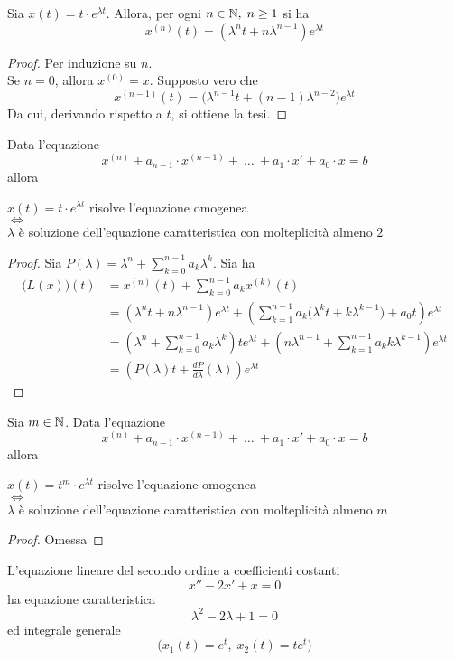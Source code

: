 \begin{lemma}
	Sia $x(t)=t \cdot e^{\lambda t}$. Allora, per ogni $n\in\mathbb{N},\;n \geq 1$ si ha
	\[x^{(n)}(t)=\left(\lambda^nt+n\lambda^{n-1}\right) e^{\lambda t}\]
	\begin{proof}
		Per induzione su $n$.\\
		Se $n=0$, allora $x^{(0)} = x$. Supposto vero che
		\[x^{(n-1)}(t) = \bigl( \lambda^{n-1} t + (n-1) \lambda^{n-2} \bigr) e^{\lambda t}\]
		Da cui, derivando rispetto a $t$, si ottiene la tesi.
	\end{proof}
\end{lemma}
\begin{proposition}
	Data l'equazione
	\[x^{(n)} + a_{n-1} \cdot x^{(n-1)} +\:\ldots\:+ a_1 \cdot x'+a_0 \cdot x = b\]
	allora
	\begin{center}
		$x(t)= t \cdot e^{\lambda t}$ risolve l'equazione omogenea\\
		$\iff$\\
		$\lambda$ è soluzione dell'equazione caratteristica con molteplicità almeno $2$
	\end{center}
	\begin{proof}
		Sia $P(\lambda) = \lambda^n + \sum\limits_{k=0}^{n-1} a_k \lambda^k$. Sia ha
		\begin{align*}
			\bigl( L(x) \bigr)(t) &= x^{(n)}(t) + \sum\limits_{k=0}^{n-1} a_k x^{(k)}(t)\\
			&= \left( \lambda^n t + n\lambda^{n-1} \right) e^{\lambda t} + \left( \sum\limits_{k=1}^{n-1} a_k \bigl( \lambda^k t + k \lambda^{k-1} \bigr) + a_0 t \right) e^{\lambda t}\\
			&= \left( \lambda^n + \sum\limits_{k=0}^{n-1} a_k \lambda^k \right) t e^{\lambda t} + \left( n \lambda^{n-1} + \sum\limits_{k=1}^{n-1} a_k k \lambda^{k-1} \right) e^{\lambda t}\\
			&= \left( P(\lambda)t + \frac{dP}{d\lambda}(\lambda) \right) e^{\lambda t}
		\end{align*}
	\end{proof}
\end{proposition}
\begin{proposition}
	Sia $m \in \mathbb{N}$. Data l'equazione
	\[x^{(n)} + a_{n-1} \cdot x^{(n-1)} +\:\ldots\:+ a_1 \cdot x'+a_0 \cdot x = b\]
	allora
	\begin{center}
		$x(t)= t^m \cdot e^{\lambda t}$ risolve l'equazione omogenea\\
		$\iff$\\
		$\lambda$ è soluzione dell'equazione caratteristica con molteplicità almeno $m$
	\end{center}
	\begin{proof}
		Omessa
	\end{proof}
\end{proposition}
\begin{example}
	L'equazione lineare del secondo ordine a coefficienti costanti
	\[x'' -2x' +x = 0\]
	ha equazione caratteristica
	\[\lambda^2 - 2\lambda + 1 = 0\]
	ed integrale generale
	\[\bigl( x_1(t) = e^t,\;x_2(t) = t e^t \bigr)\]
\end{example}
\cbend


